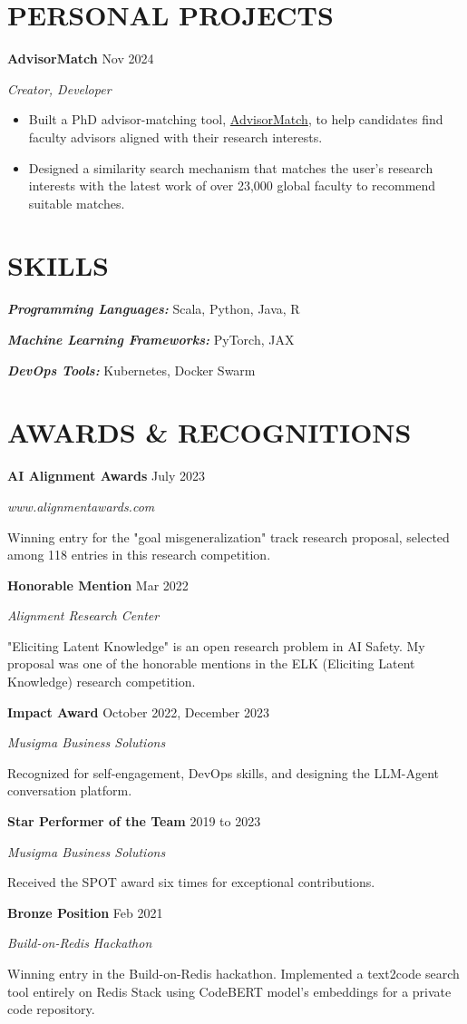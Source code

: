 \documentclass[fontsize=11pt]{article}
\newcommand{\sepspace}{\vspace*{1em}}
\newcommand{\NewPart}[1]{\section*{\uppercase{#1}}}
\newcommand{\SkillsEntry}[2]{
    \noindent\textbf{\textit{#1}} \hspace{1.5em} #2 \par}
\newcommand{\ProjectEntry}[4]{
    \noindent \textbf{#1} \hfill {#2} \par
    \noindent \textit{#3} \par
    \noindent \small #4
    \normalsize \par}
\newcommand{\AwardEntry}[4]{
    \noindent \textbf{#1} \hfill {#2} \par
    \noindent \textit{#3} \par
    \noindent \small #4
    \normalsize \par}
\begin{document}
\NewPart{PERSONAL PROJECTS}

\ProjectEntry{AdvisorMatch}{Nov 2024}{Creator, Developer}
{%
\begin{itemize}
\item Built a PhD advisor-matching tool,  {\href{https://advisormatch.ngrok.io}{AdvisorMatch}}, to help candidates find faculty advisors aligned with their research interests.
\item Designed a similarity search mechanism that matches the user's research interests with the latest work of over 23,000 global faculty to recommend suitable matches.
\end{itemize}}

\NewPart{SKILLS}
\SkillsEntry{Programming Languages:}{Scala, Python, Java, R}
\SkillsEntry{Machine Learning Frameworks:}{PyTorch, JAX}
\SkillsEntry{DevOps Tools:}{Kubernetes, Docker Swarm}

\NewPart{AWARDS \& RECOGNITIONS}

\AwardEntry{AI Alignment Awards}{July 2023}{www.alignmentawards.com}
{Winning entry for the "goal misgeneralization" track research proposal, selected among 118 entries in this research competition.}

\sepspace

\AwardEntry{Honorable Mention}{Mar 2022}{Alignment Research Center}
{"Eliciting Latent Knowledge" is an open research problem in AI Safety. My proposal was one of the honorable mentions in the ELK (Eliciting Latent Knowledge) research competition.}

\sepspace

\AwardEntry{Impact Award}{October 2022, December 2023}{Musigma Business Solutions}
{Recognized for self-engagement, DevOps skills, and designing the LLM-Agent conversation platform.}

\sepspace

\AwardEntry{Star Performer of the Team}{2019 to 2023}{Musigma Business Solutions}
{Received the SPOT award six times for exceptional contributions.}

\sepspace

\AwardEntry{Bronze Position}{Feb 2021}{Build-on-Redis Hackathon}
{Winning entry in the Build-on-Redis hackathon. Implemented a text2code search tool entirely on Redis Stack using CodeBERT model's embeddings for a private code repository.}
\end{document}
